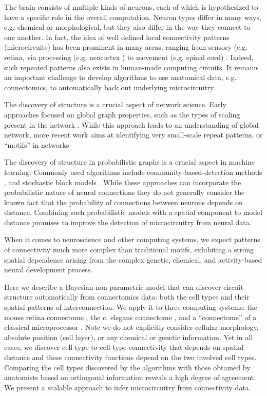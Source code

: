 \documentclass{article}
\begin{document}
The brain consists of multiple kinds of neurons, each of which is
hypothesized to have a specific role in the overall
computation. Neuron types differ in many ways, e.g. chemical or
morphological, but they also differ in the way they connect to one
another. In fact, the idea of well defined local connectivity patterns
(microcircuits) has been prominent in many areas, ranging from sensory
(e.g. retina, \autocite{Masland2001} via processing (e.g. neocortex
\autocite{Mountcastle1997}) to movement (e.g. spinal cord)
\autocite{Grillner2005}. Indeed, such repeated patterns also exists in
human-made computing circuits. It remains an important challenge to
develop algorithms to use anatomical data, e.g. connectomics, to automatically back
out underlying microcircuitry.

The discovery of structure is a crucial aspect of network
science. Early approaches focused on global graph properties, such as
the types of scaling present in the network \autocite
{WattsStrogatz1998} .  While this approach leads to an understanding
of global network, more recent work aims at identifying very small-scale
repeat patterns, or “motifs” in networks\autocite{Milo2002}

The discovery of structure in probabilistic graphs is a crucial aspect
in machine learning. Commonly used algorithms include
community-based-detection methods \autocite{Girvan2002}, and
stochastic block models \autocite{Nowicki2001}.  While these
approaches can incorporate the probabilistic nature of neural
connections \autocite{Hill2012} they do not generally consider the
known fact that the probability of connections between neurons depends
on distance. Combining such probabilistic models with a spatial
component to model distance promises to improve the detection of
microcircuitry from neural data.

When it comes to neuroscience and other computing systems, we expect
patterns of connectivity much more complex than traditional motifs,
exhibiting a strong spatial dependence arising from the complex
genetic, chemical, and activity-based neural development process. 


Here we describe a Bayesian non-parametric model that can discover
circuit structure automatically from connectomics data: both the cell
types and their spatial patterns of interconnection. We apply it to
three computing systems: the mouse retina connectome
\autocite{Helmstaedter2013}, the c. elegans connectome
\autocite{White1986}, and a ``connectome'' of a classical
microprocessor \autocite{James2010}. Note we do not explicitly
consider cellular morphology, absolute position (cell layer), or any
chemical or genetic information. Yet in all cases, we discover
cell-type to cell-type connectivity that depends on spatial distance
and these connectivity functions depend on the two involved cell
types. Comparing the cell types discovered by the algorithms with
those obtained by anatomists based on orthogonal information reveals a
high degree of agreement. We present a scalable approach to infer
microcircuitry from connectivity data.
\end{document}
